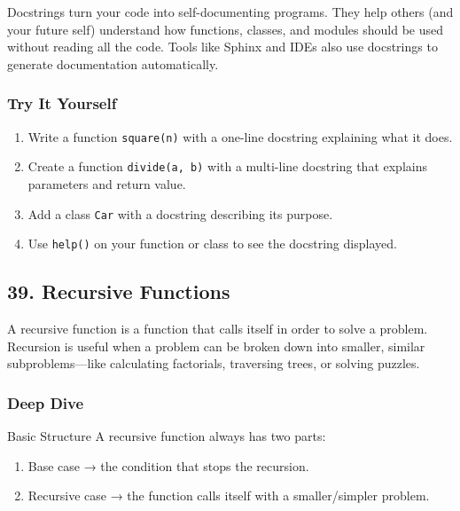 \documentclass[
  letterpaper,
  DIV=11,
  numbers=noendperiod]{scrreprt}
\providecommand{\tightlist}{%
  \setlength{\itemsep}{0pt}\setlength{\parskip}{0pt}}
\begin{document}
Docstrings turn your code into self-documenting programs. They help
others (and your future self) understand how functions, classes, and
modules should be used without reading all the code. Tools like Sphinx
and IDEs also use docstrings to generate documentation automatically.

\subsubsection{Try It Yourself}\label{try-it-yourself-37}

\begin{enumerate}
\def\labelenumi{\arabic{enumi}.}
\tightlist
\item
  Write a function \texttt{square(n)} with a one-line docstring
  explaining what it does.
\item
  Create a function \texttt{divide(a,\ b)} with a multi-line docstring
  that explains parameters and return value.
\item
  Add a class \texttt{Car} with a docstring describing its purpose.
\item
  Use \texttt{help()} on your function or class to see the docstring
  displayed.
\end{enumerate}

\subsection{39. Recursive Functions}\label{recursive-functions}

A recursive function is a function that calls itself in order to solve a
problem. Recursion is useful when a problem can be broken down into
smaller, similar subproblems---like calculating factorials, traversing
trees, or solving puzzles.

\subsubsection{Deep Dive}\label{deep-dive-38}

Basic Structure A recursive function always has two parts:

\begin{enumerate}
\def\labelenumi{\arabic{enumi}.}
\tightlist
\item
  Base case → the condition that stops the recursion.
\item
  Recursive case → the function calls itself with a smaller/simpler
  problem.
\end{enumerate}
\end{document}

